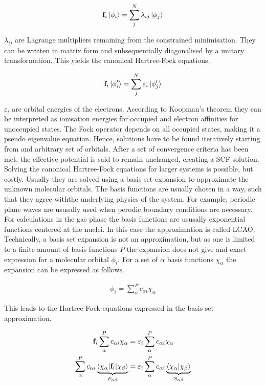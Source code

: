\begin{align}
    \mathbf{f}_i\ket{\phi_i}=\sum_j^N\lambda_{ij}\ket{\phi_j}\label{eqn:HFequations}
\end{align}

$\lambda_{ij}$ are Lagrange multipliers remaining from the constrained
minimisation. They can be written in matrix form and subsequentially
diagonalised by a unitary transformation. This yields the canonical
Hartree-Fock equations.

\begin{align}
    \mathbf{f}_i\ket{\phi'_i}=\sum_j^N\varepsilon_i\ket{\phi'_j}\label{eqn:HFequationscanonical}
\end{align}

$\varepsilon_i$ are orbital energies of the electrons. According to Koopman's
theorem they can be interpreted as ionisation energies for occupied and
electron affinities for unoccupied states. The Fock operator depends on all
occupied states, making it a pseudo eigenvalue equation. Hence, solutions have
to be found iteratively starting from and arbitrary set of orbitals. After a
set of convergence criteria has been met, the effective potential is said to
remain unchanged, creating a \ac{SCF} solution.  \\\newline Solving the
canonical Hartree-Fock equations for larger systems is possible, but costly.
Usually they are solved using a basis set expansion to approximate the unknown
molecular orbitals. The basis functions are usually chosen in a way, such that
they agree withthe underlying physics of the system. For example, periodic
plane waves are ususally used when perodic boundary conditions are necessary.
For calculations in the gas phase the basis functions are ususally exponential
functions centered at the nuclei. In this case the approximation is called
\ac{LCAO}. Technically, a basis set expansion is not an approximation, but as
one is limited to a finite amount of basis functions $P$ the expansion does not
give and exact expression for a molecular orbital $\phi_i$. For a set of
$\alpha$ basis functions $\chi_\alpha$ the expansion can be expressed as
follows.

\begin{align}
    \phi_i=\sum_\alpha^Pc_{\alpha i}\chi_\alpha
\end{align}

This leads to the Hartree-Fock equations expressed in the basis set
approximation.

\begin{align}
    \begin{aligned}
        \mathbf{f}_i\sum_\alpha^Pc_{\alpha i}\chi_\alpha&=\varepsilon_i\sum_\alpha^Pc_{\alpha i}\chi_\alpha \\
        \sum_\alpha^Pc_{\alpha i}\underbrace{\braket{\chi_\alpha|\mathbf{f}_i|\chi_\beta}}_{F_{\alpha\beta}}&=\varepsilon_i\sum_\alpha^Pc_{\alpha i}\underbrace{\braket{\chi_\alpha|\chi_\beta}}_{S_{\alpha\beta}}
    \end{aligned}
\end{align}

